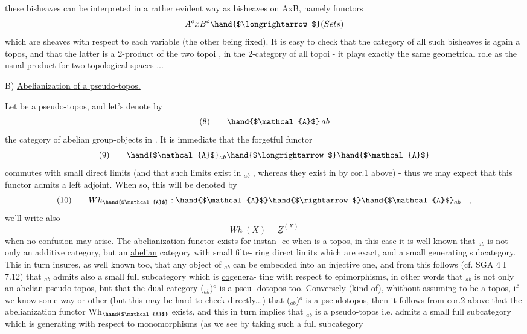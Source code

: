 these bisheaves can be interpreted in a rather evident way as bisheaves
on AxB, namely functors
\[ A^{o}xB^{o} \hand{$\longrightarrow$} (Sets) \]
which are sheaves with respect to each variable (the other being fixed).
It is easy to check that the category of all such bisheaves is again a
topos, and that the latter is a 2-product of the two topoi , in the
2-category of all topoi - it plays exactly the same geometrical role as
the usual product for two topological spaces ...

B) \uline{Abelianization of a pseudo-topos.}

Let  be a pseudo-topos, and let's denote by
\[ (8) \qquad \hand{$\mathcal{A}$}\,ab \]
the category of abelian group-objects in  . It is immediate that the
forgetful functor
\[ (9) \qquad \hand{$\mathcal{A}$}_{ab} \hand{$\longrightarrow$} \hand{$\mathcal{A}$} \]
commutes with small direct limits (and that such limits exist in $_{ab}$ ,
whereas they exist in  by cor.1 above) - thus we may expect that this
functor admits a left adjoint. When so, this will be denoted by
\[ (10) \qquad Wh_{\hand{$\mathcal{A}$}} : \hand{$\mathcal{A}$} \hand{$\rightarrow$} \hand{$\mathcal{A}$}_{ab} \quad , \]
we'll write also
\[ Wh\ (X) = \underline{Z}^{(X)} \]
when no confusion may arise. The abelianization functor exists for instan-%
ce when  is a topos, in this case it is well known that $_{ab}$ is 
not only an additive category, but an \uline{abelian} category with small filte-%
ring direct limits which are exact, and a small generating subcategory.
This in turn insures, as well known too, that any object of $_{ab}$ can be
embedded into an injective one, and from this follows (cf. SGA 4 I
7.12) that $_{ab}$ admits also a small full subcategory which is \uline{co}genera-%
ting with respect to epimorphisms, in other words that $_{ab}$ is not only
an abelian pseudo-topos, but that the dual category ($_{ab}$)$^{o}$ is a pseu-%
dotopos too. Conversely (kind of), whithout assuming  to be a topos,
if we know some way or other (but this may be hard to check directly...)
that ($_{ab}$)$^{o}$ is a pseudotopos, then it follows from cor.2 above that the
abelianization functor Wh$_{\hand{$\mathcal{A}$}}$ exists, and this in turn implies that $_{ab}$
is a pseudo-topos i.e. admits a small full subcategory which is generating
with respect to monomorphisms (as we see by taking such a full subcategory

